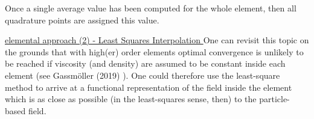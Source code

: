 

Once a single average value has been computed for the whole element, then 
all quadrature points are assigned this value. 


\underline{elemental approach (2) - Least Squares Interpolation } 
One can revisit this topic on the grounds that 
with high(er) order elements optimal convergence is unlikely to be reached 
if viscosity (and density) are assumed to be constant inside each element (see  
Gassm\"oller \etal (2019) \cite{galb19}). 
One could therefore use the least-square method to arrive at 
a functional representation of the field inside the element which is as 
close as possible (in the least-squares sense, then) to the particle-based field. 

